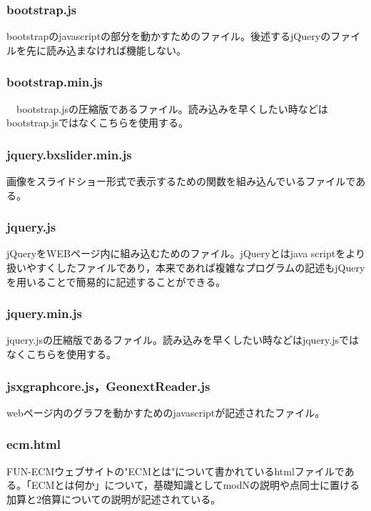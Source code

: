 \documentclass[openany,11pt,papersize]{jsbook}
\begin{document}
\subsubsection{bootstrap.js}
bootstrapのjavascriptの部分を動かすためのファイル。後述するjQueryのファイルを先に読み込まなければ機能しない。

\subsubsection{bootstrap.min.js}
　bootstrap.jsの圧縮版であるファイル。読み込みを早くしたい時などはbootstrap.jsではなくこちらを使用する。

\subsubsection{jquery.bxslider.min.js}
画像をスライドショー形式で表示するための関数を組み込んでいるファイルである。

\subsubsection{jquery.js}
jQueryをWEBページ内に組み込むためのファイル。jQueryとはjava scriptをより扱いやすくしたファイルであり，本来であれば複雑なプログラムの記述もjQueryを用いることで簡易的に記述することができる。

\subsubsection{jquery.min.js}
jquery.jsの圧縮版であるファイル。読み込みを早くしたい時などはjquery.jsではなくこちらを使用する。

\subsubsection{jsxgraphcore.js，GeonextReader.js}
webページ内のグラフを動かすためのjavascriptが記述されたファイル。

\subsubsection{ecm.html}
FUN-ECMウェブサイトの"ECMとは"について書かれているhtmlファイルである。「ECMとは何か」について，基礎知識としてmodNの説明や点同士に置ける加算と2倍算についての説明が記述されている。
\end{document}
